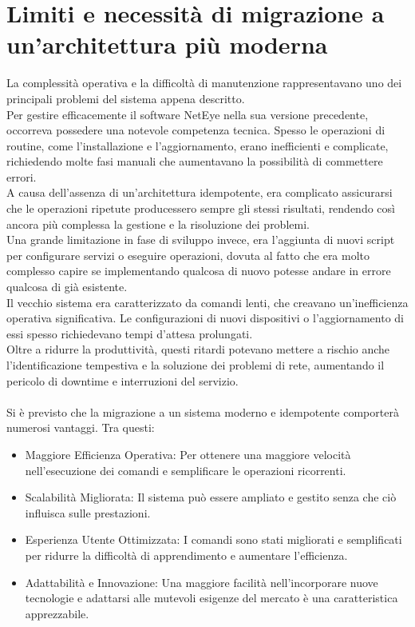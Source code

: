 \section{Limiti e necessità di migrazione a un'architettura più moderna}
\label{sec:necessita_di_migrazione} La complessità operativa e la difficoltà di manutenzione
rappresentavano uno dei principali problemi del sistema appena descritto.\\ Per gestire
efficacemente il software NetEye nella sua versione precedente, occorreva
possedere una notevole competenza tecnica. Spesso le operazioni di routine, come
l'installazione e l'aggiornamento, erano inefficienti e complicate, richiedendo
molte fasi manuali che aumentavano la possibilità di commettere errori.\\ A
causa dell'assenza di un'architettura idempotente, era complicato assicurarsi che
le operazioni ripetute producessero sempre gli stessi risultati, rendendo così
ancora più complessa la gestione e la risoluzione dei problemi.\\ Una grande
limitazione in fase di sviluppo invece, era l'aggiunta di nuovi script per configurare
servizi o eseguire operazioni, dovuta al fatto che era molto complesso capire se
implementando qualcosa di nuovo potesse andare in errore qualcosa di già
esistente.\\ Il vecchio sistema era caratterizzato da comandi lenti, che creavano
un'inefficienza operativa significativa. Le configurazioni di nuovi dispositivi
o l'aggiornamento di essi spesso richiedevano tempi d'attesa prolungati.\\ Oltre
a ridurre la produttività, questi ritardi potevano mettere a rischio anche l'identificazione
tempestiva e la soluzione dei problemi di rete, aumentando il pericolo di
downtime e interruzioni del servizio.\\ \\ Si è previsto che la migrazione a un
sistema moderno e idempotente comporterà numerosi vantaggi. Tra questi:
\begin{itemize}
  \item Maggiore Efficienza Operativa: Per ottenere una maggiore velocità nell'esecuzione
    dei comandi e semplificare le operazioni ricorrenti.

  \item Scalabilità Migliorata: Il sistema può essere ampliato e gestito senza
    che ciò influisca sulle prestazioni.

  \item Esperienza Utente Ottimizzata: I comandi sono stati migliorati e
    semplificati per ridurre la difficoltà di apprendimento e aumentare l'efficienza.

  \item Adattabilità e Innovazione: Una maggiore facilità nell'incorporare nuove
    tecnologie e adattarsi alle mutevoli esigenze del mercato è una
    caratteristica apprezzabile.
\end{itemize}
